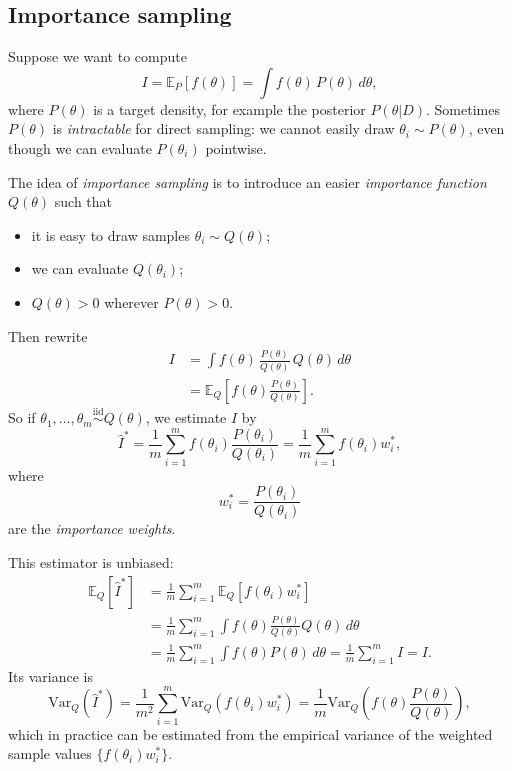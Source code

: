 \documentclass[11pt, titlepage]{article} %
\numberwithin{equation}{section}
\theoremstyle{definition}
\numberwithin{assumption}{section}
\begin{document}
\subsection{Importance sampling}

Suppose we want to compute
\begin{equation*}
    I=\mathbb{E}_{P}[f(\theta)]=\int f(\theta)\,P(\theta)\,d\theta,
\end{equation*}
where $P(\theta)$ is a target density, for example the posterior $P(\theta|D)$. Sometimes $P(\theta)$ is \textit{intractable} for direct sampling: we cannot easily draw $\theta_i\sim P(\theta)$, even though we can evaluate $P(\theta_i)$ pointwise.

The idea of \textit{importance sampling} is to introduce an easier \textit{importance function} $Q(\theta)$ such that
\begin{itemize}
    \item it is easy to draw samples $\theta_i\sim Q(\theta)$;
    \item we can evaluate $Q(\theta_i)$;
    \item $Q(\theta)>0$ wherever $P(\theta)>0$.
\end{itemize}

Then rewrite
\begin{align*}
    I
    &= \int f(\theta)\,\frac{P(\theta)}{Q(\theta)}\,Q(\theta)\,d\theta\\
    &= \mathbb{E}_{Q}\!\left[f(\theta)\frac{P(\theta)}{Q(\theta)}\right].
\end{align*}
So if $\theta_1,\dots,\theta_m \overset{\mathrm{iid}}{\sim} Q(\theta)$, we estimate $I$ by
\begin{equation*}
    \hat I^*
    =
    \frac{1}{m}\sum_{i=1}^m f(\theta_i)\frac{P(\theta_i)}{Q(\theta_i)}
    =
    \frac{1}{m}\sum_{i=1}^m f(\theta_i)w_i^*,
\end{equation*}
where
\begin{equation*}
    w_i^*=\frac{P(\theta_i)}{Q(\theta_i)}
\end{equation*}
are the \textit{importance weights}.

This estimator is unbiased:
\begin{align*}
    \mathbb{E}_{Q}[\hat I^*]
    &= \frac{1}{m}\sum_{i=1}^m \mathbb{E}_{Q}[f(\theta_i)w_i^*]\\
    &= \frac{1}{m}\sum_{i=1}^m \int f(\theta)\frac{P(\theta)}{Q(\theta)}Q(\theta)\,d\theta\\
    &= \frac{1}{m}\sum_{i=1}^m \int f(\theta)P(\theta)\,d\theta= \frac{1}{m}\sum_{i=1}^m I= I.
\end{align*}
Its variance is
\begin{equation*}
    \mathrm{Var}_Q(\hat I^*)
    =\frac{1}{m^2}\sum_{i=1}^m\mathrm{Var}_Q(f(\theta_i)w_i^*)
    =
    \frac{1}{m}\mathrm{Var}_{Q}\!\left(f(\theta)\frac{P(\theta)}{Q(\theta)}\right),
\end{equation*}
which in practice can be estimated from the empirical variance of the weighted sample values $\{f(\theta_i)w_i^*\}$.
\end{document}

